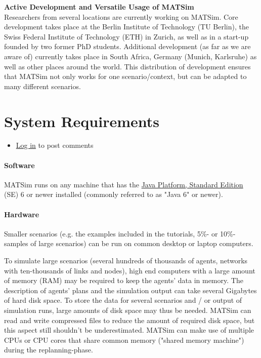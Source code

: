\documentclass[a4paper,11pt]{report}
\begin{document}
\textbf{Active Development and Versatile Usage of MATSim}
\\  Researchers from several locations are currently working on MATSim.  Core development takes place at the Berlin Institute of Technology (TU  Berlin), the Swiss Federal Institute of Technology (ETH) in Zurich, as  well as in a start-up founded by two former PhD students. Additional  development (as far as we are aware of) currently takes place in South  Africa, Germany (Munich, Karlsruhe) as well as other places around the  world. This distribution of development ensures that MATSim not only  works for one scenario/context, but can be adapted to many different  scenarios.


\chapter{System Requirements}
\begin{itemize}
	\item \href{http://www.matsim.org/user/login?destination=comment/reply/141%23comment-form}{Log in} to post comments
\end{itemize}

\subsubsection{Software}

MATSim runs on any machine that has the \href{http://java.sun.com/javase/downloads/index.jsp}{Java Platform, Standard Edition} (SE) 6 or newer installed (commonly referred to as "Java 6" or newer).

\subsubsection{Hardware}

Smaller  scenarios (e.g. the examples included in the tutorials, 5\%- or  10\%-samples of large scenarios) can be run on common desktop or laptop  computers.

To simulate large scenarios (several hundreds of  thousands of agents, networks with ten-thousands of links and nodes),  high end computers with a large amount of memory (RAM) may be required  to keep the agents' data in memory. The description of agents' plans and  the simulation output can take several Gigabytes of hard disk space. To  store the data for several scenarios and / or output of simulation  runs, large amounts of disk space may thus be needed. MATSim can read  and write compressed files to reduce the amount of required disk space,  but this aspect still shouldn't be underestimated. MATSim can make use  of multiple CPUs or CPU cores that share common memory ("shared memory  machine") during the replanning-phase.
\end{document}
